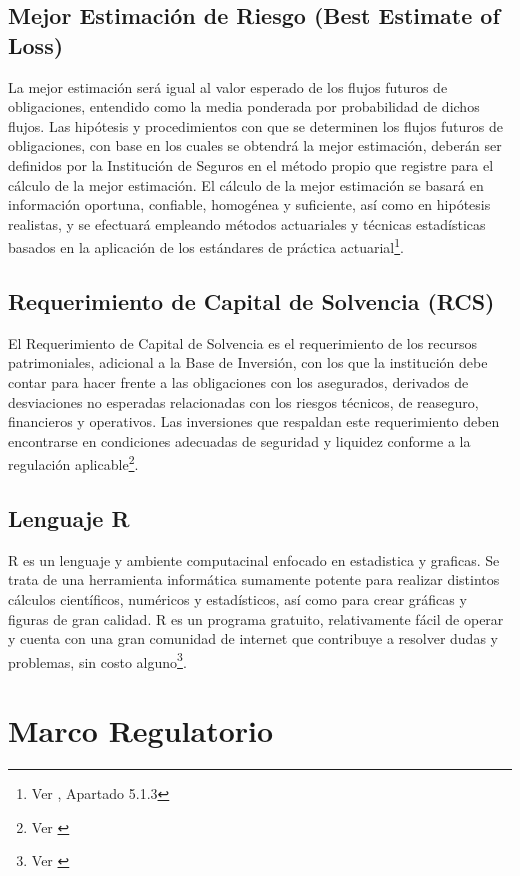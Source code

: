 \documentclass[11pt,twoside,openright,spanish]{report}
\numberwithin{equation}{chapter}
\numberwithin{figure}{chapter}
\numberwithin{table}{chapter}
\begin{document}
	\section{Mejor Estimación de Riesgo (Best Estimate of Loss)}
	
	La mejor estimación será igual al valor esperado de los flujos futuros de obligaciones, entendido como la media ponderada por probabilidad de dichos flujos. Las hipótesis y procedimientos con que se determinen los flujos futuros de obligaciones, con base en los cuales se obtendrá la mejor estimación, deberán ser definidos por la Institución de Seguros en el método propio que registre para el cálculo de la mejor estimación. El cálculo de la mejor estimación se basará en información oportuna, confiable, homogénea y suficiente, así como en hipótesis realistas, y se efectuará empleando métodos actuariales y técnicas estadísticas basados en la aplicación de los estándares de práctica actuarial\footnote{Ver \citet{HCusf}, Apartado 5.1.3}.
	
	\section{Requerimiento de Capital de Solvencia (RCS)}
	
	El Requerimiento de Capital de Solvencia es el requerimiento de los recursos patrimoniales, adicional a la Base de Inversión, con los que la institución debe contar para hacer frente a las obligaciones con los asegurados, derivados de desviaciones no esperadas relacionadas con los riesgos técnicos, de reaseguro, financieros y operativos. Las inversiones que respaldan este requerimiento deben encontrarse en condiciones adecuadas de seguridad y liquidez conforme a la regulación aplicable\footnote{Ver \citet{NRCS}}.
	
	
		\section{Lenguaje R}
	R es un lenguaje y ambiente computacinal enfocado en estadistica y graficas. Se trata de una herramienta informática sumamente potente para realizar distintos cálculos científicos, numéricos y estadísticos, así como para crear gráficas y figuras de gran calidad. R es un programa gratuito, relativamente fácil de operar y cuenta con una gran comunidad de internet que contribuye a resolver dudas y problemas, sin costo alguno\footnote{Ver \citet{KR}}.
	
	\chapter{Marco Regulatorio}\label{tcyedb}
	
\end{document}
